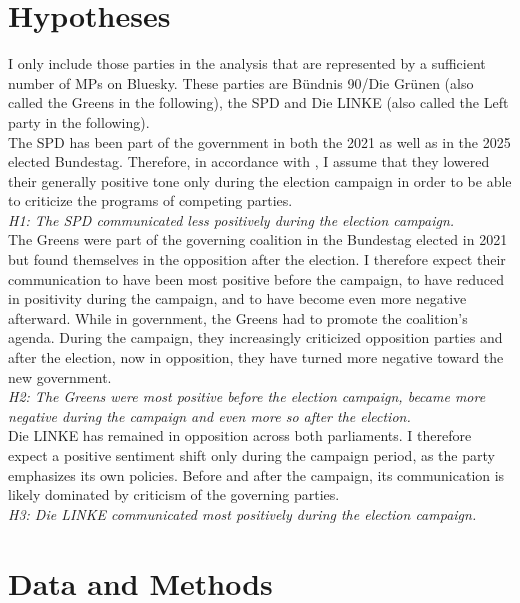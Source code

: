 \documentclass{article}
\begin{document}
\section{Hypotheses}
I only include those parties in the analysis that are represented by a sufficient number of MPs on Bluesky. These parties are Bündnis 90/Die Grünen (also called the Greens in the following), the SPD and Die LINKE (also called the Left party in the following). \\
\noindent The SPD has been part of the government in both the 2021 as well as in the 2025 elected Bundestag. Therefore, in accordance with \textcite{castanho_silva_modulation_2024}, I assume that they lowered their generally positive tone only during the election campaign in order to be able to criticize the programs of competing parties. \\

\noindent \textit{H1: The SPD communicated less positively during the election campaign.} \\

\noindent The Greens were part of the governing coalition in the Bundestag elected in 2021 but found themselves in the opposition after the election. I therefore expect their communication to have been most positive before the campaign, to have reduced in positivity during the campaign, and to have become even more negative afterward. While in government, the Greens had to promote the coalition’s agenda. During the campaign, they increasingly criticized opposition parties and after the election, now in opposition, they have turned more negative toward the new government.\\

\noindent \textit{H2: The Greens were most positive before the election campaign, became more negative during the campaign and even more so after the election.} \\

\noindent Die LINKE has remained in opposition across both parliaments. I therefore expect a positive sentiment shift only during the campaign period, as the party emphasizes its own policies. Before and after the campaign, its communication is likely dominated by criticism of the governing parties. \\

\noindent \textit{H3: Die LINKE communicated most positively during the election campaign.}\\

\section{Data and Methods}
\end{document}
